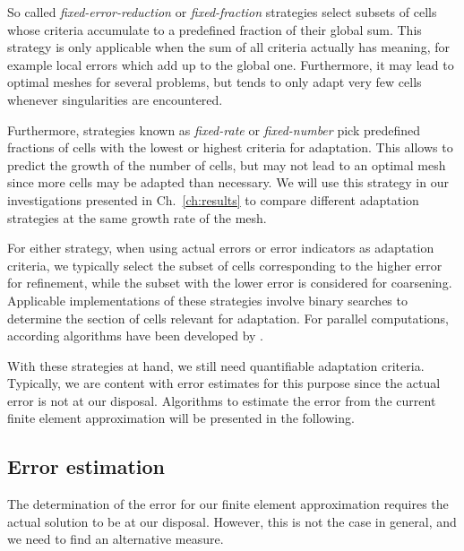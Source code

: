 So called \textit{fixed-error-reduction} or \textit{fixed-fraction} strategies select subsets of cells whose criteria accumulate to a predefined fraction of their global sum. This strategy is only applicable when the sum of all criteria actually has meaning, for example local errors which add up to the global one. Furthermore, it may lead to optimal meshes for several problems, but tends to only adapt very few cells whenever singularities are encountered.

Furthermore, strategies known as \textit{fixed-rate} or \textit{fixed-number} pick predefined fractions of cells with the lowest or highest criteria for adaptation. This allows to predict the growth of the number of cells, but may not lead to an optimal mesh since more cells may be adapted than necessary. We will use this strategy in our investigations presented in Ch.~\ref{ch:results} to compare different adaptation strategies at the same growth rate of the mesh.

For either strategy, when using actual errors or error indicators as adaptation criteria, we typically select the subset of cells corresponding to the higher error for refinement, while the subset with the lower error is considered for coarsening. Applicable implementations of these strategies involve binary searches to determine the section of cells relevant for adaptation. For parallel computations, according algorithms have been developed by \textcites[Sec.~3.1]{burstedde2008}[Sec.~5.1]{bangerth2012}.

With these strategies at hand, we still need quantifiable adaptation criteria. Typically, we are content with error estimates for this purpose since the actual error is not at our disposal. Algorithms to estimate the error from the current finite element approximation will be presented in the following.



\subsection{Error estimation}
\label{ssec:estimation}


The determination of the error for our finite element approximation requires the actual solution to be at our disposal. However, this is not the case in general, and we need to find an alternative measure.

